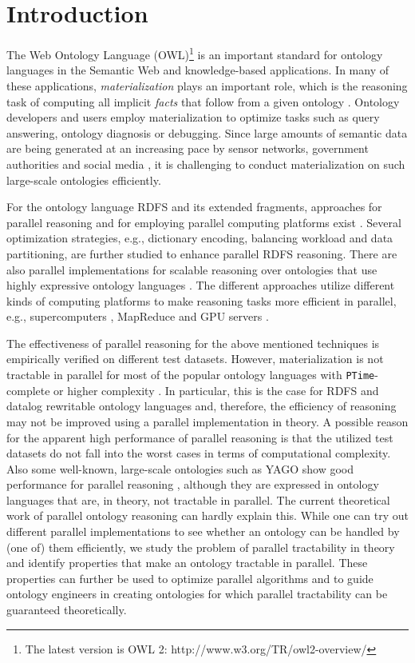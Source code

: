 \section{Introduction}
\label{sec:introduction}

The Web Ontology Language (OWL)\footnote{The latest version is OWL 2: http://www.w3.org/TR/owl2-overview/}
is an important standard for ontology languages in the Semantic Web and knowledge-based applications.
In many of these applications, \emph{materialization} plays an important role, which is the reasoning task of computing all implicit
\emph{facts} that follow from a given ontology \cite{handbook}. Ontology developers and users employ materialization to optimize tasks such as query answering, ontology diagnosis or debugging. Since large amounts of semantic data
are being generated at an increasing pace by sensor networks, government authorities and social
media \cite{LehmbergRMB16,MeuselBP15}, it is challenging to conduct materialization on such large-scale ontologies efficiently.

For the ontology language RDFS and its extended fragments, approaches for parallel reasoning and for employing parallel computing platforms exist
 \cite{MotikNPHO14,PetersSZ15,SubercazeGCL16}. Several optimization strategies, e.g., dictionary encoding, balancing workload
and data partitioning, are further studied to enhance parallel RDFS reasoning. There are also parallel implementations for scalable
reasoning over ontologies that use highly expressive ontology languages \cite{SteigmillerLG14,WuH12}. The different approaches utilize different kinds of computing platforms to make reasoning tasks more efficient in parallel, e.g., supercomputers \cite{Hoeksema2011,GoodmanJMAAH11},
MapReduce \cite{UrbaniKMHB12} and GPU servers \cite{HeinoP12}.

The effectiveness of parallel reasoning for the above mentioned techniques is empirically verified on different test datasets.
However, materialization is not tractable in parallel for most of the popular ontology languages with \texttt{PTime}-complete or higher complexity \cite{Raymond95}. In particular, this is the case for RDFS and datalog rewritable ontology languages and, therefore, the efficiency of reasoning may not be
improved using a parallel implementation in theory. A possible reason for the apparent high performance of parallel
reasoning is that the utilized test datasets do not fall into the worst cases in terms of computational complexity. Also some well-known, large-scale ontologies such as YAGO show good performance for parallel
reasoning \cite{KolovskiWE10}, although they are expressed in ontology languages that are, in theory, not tractable in parallel.
The current theoretical work of parallel ontology reasoning can hardly explain this.
While one can try out different parallel implementations to see whether an ontology can be handled by (one of) them efficiently,
we study the problem of parallel tractability in theory and identify properties that make an ontology tractable in parallel.
These properties can further be used to optimize parallel algorithms and to guide ontology engineers in creating ontologies
for which parallel tractability can be guaranteed theoretically.

